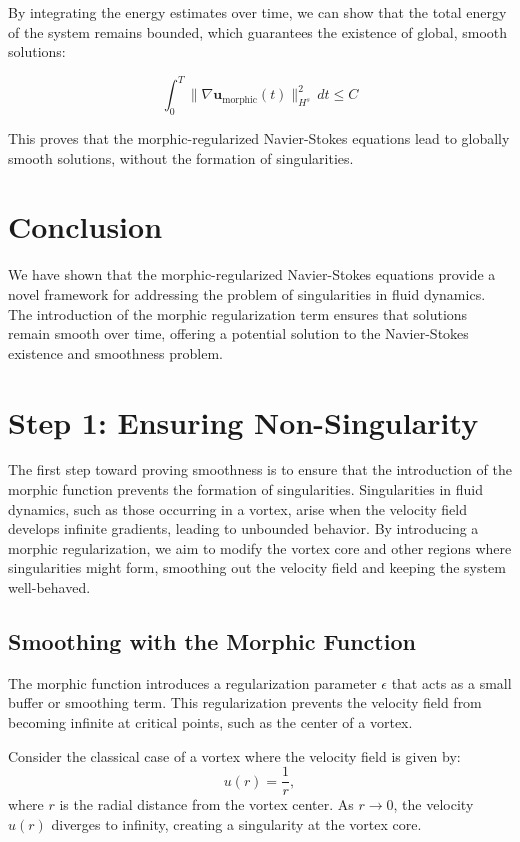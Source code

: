 \documentclass{article}
\begin{document}
By integrating the energy estimates over time, we can show that the total energy of the system remains bounded, which guarantees the existence of global, smooth solutions:

\[
\int_0^T \| \nabla \mathbf{u}_{\text{morphic}}(t) \|_{H^s}^2 \, dt \leq C
\]

This proves that the morphic-regularized Navier-Stokes equations lead to globally smooth solutions, without the formation of singularities.

\section*{Conclusion}

We have shown that the morphic-regularized Navier-Stokes equations provide a novel framework for addressing the problem of singularities in fluid dynamics. The introduction of the morphic regularization term ensures that solutions remain smooth over time, offering a potential solution to the Navier-Stokes existence and smoothness problem.


\section*{Step 1: Ensuring Non-Singularity}

The first step toward proving smoothness is to ensure that the introduction of the morphic function prevents the formation of singularities. Singularities in fluid dynamics, such as those occurring in a vortex, arise when the velocity field develops infinite gradients, leading to unbounded behavior. By introducing a morphic regularization, we aim to modify the vortex core and other regions where singularities might form, smoothing out the velocity field and keeping the system well-behaved.

\subsection*{Smoothing with the Morphic Function}

The morphic function introduces a regularization parameter \( \epsilon \) that acts as a small buffer or smoothing term. This regularization prevents the velocity field from becoming infinite at critical points, such as the center of a vortex.

Consider the classical case of a vortex where the velocity field is given by:
\[
u(r) = \frac{1}{r},
\]
where \( r \) is the radial distance from the vortex center. As \( r \to 0 \), the velocity \( u(r) \) diverges to infinity, creating a singularity at the vortex core.
\end{document}

